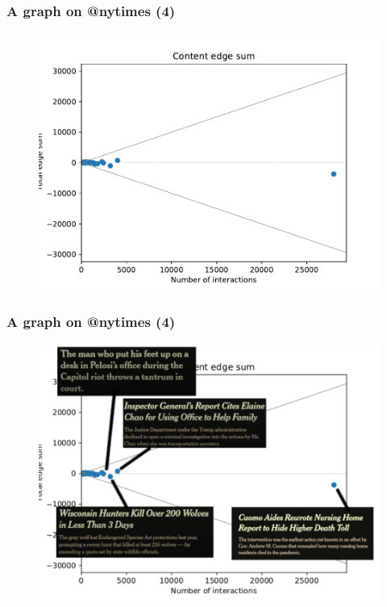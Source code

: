 \documentclass{beamer}
\begin{document}
\begin{frame}[c]
    \frametitle{A graph on @nytimes (4)}
    \begin{figure}[htpb]
        \centering
        \includegraphics[width=0.8\linewidth]{out/nytimes400/edge-sum-n-interactions.pdf}
    \end{figure}
\end{frame}

\begin{frame}[c]
    \frametitle{A graph on @nytimes (4)}
    \begin{figure}[htpb]
        \centering
        \includegraphics[width=0.8\linewidth]{img/edge-sum-n-interactions-labeled.pdf}
    \end{figure}
\end{frame}
\end{document}
